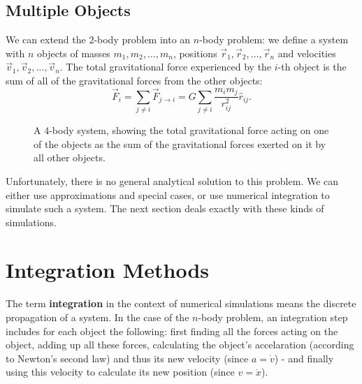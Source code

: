 \subsection{Multiple Objects}
We can extend the 2-body problem into an $n$-body problem: we define a system with $n$ objects of masses $m_{1},m_{2},\dots,m_{n}$, positions $\vec{r}_{1},\vec{r}_{2},\dots,\vec{r}_{n}$ and velocities $\vec{v}_{1},\vec{v}_{2},\dots,\vec{v}_{n}$. The total gravitational force experienced by the $i$-th object is the sum of all of the gravitational forces from the other objects:
\begin{equation}
  \vec{F}_{i} = \sum\limits_{j\neq i}\vec{F}_{j\to i} = G\sum\limits_{j\neq i}\frac{m_{i}m_{j}}{r_{ij}^{2}}\hat{r}_{ij}.
  \label{eq:n_body_single_force}
\end{equation}

\begin{figure}
  \begin{center}
  \end{center}
  \caption{A $4$-body system, showing the total gravitational force acting on one of the objects as the sum of the gravitational forces exerted on it by all other objects.}
  \label{fig:4_body_system}
\end{figure}

Unfortunately, there is no general analytical solution to this problem. We can either use approximations and special cases, or use numerical integration to simulate such a system. The next section deals exactly with these kinds of simulations.

\section{Integration Methods}
The term \textbf{integration} in the context of numerical simulations means the discrete propagation of a system. In the case of the $n$-body problem, an integration step includes for each object the following: first finding all the forces acting on the object, adding up all these forces, calculating the object's accelaration (according to Newton's second law) and thus its new velocity (since $a=\dot{v}$) - and finally using this velocity to calculate its new position (since $v=\dot{x}$).

